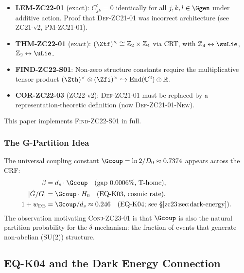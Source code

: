 \documentclass[12pt, a4paper]{article}
\begin{document}
\begin{formalbox}[title={Inherited Results from ZC21/ZC22}]
\begin{itemize}[leftmargin=*, noitemsep]
  \item \textbf{LEM-ZC22-01} (exact): $C_{jk}^l = 0$ identically for all
    $j,k,l\in\Ggen$ under additive action. Proof that \textsc{Def-ZC21-01}
    was incorrect architecture (see ZC21-v2, PM-ZC21-01).
  \item \textbf{THM-ZC22-01} (exact): $(\Ztf)^\times \cong \mathbb{Z}_2\times\mathbb{Z}_4$
    via CRT, with $\mathbb{Z}_4\leftrightarrow\suLie$, $\mathbb{Z}_2\leftrightarrow\uLie$.
  \item \textbf{FIND-ZC22-S01}: Non-zero structure constants require the
    multiplicative tensor product $(\Zth)^\times\otimes(\Zfi)^\times
    \hookrightarrow\mathrm{End}(\mathbb{C}^2)\oplus\mathbb{R}$.
  \item \textbf{COR-ZC22-03} (ZC22-v2): \textsc{Def-ZC21-01} must be replaced
    by a representation-theoretic definition (now \textsc{Def-ZC21-01-New}).
\end{itemize}
\end{formalbox}

This paper implements \textsc{Find-ZC22-S01} in full.

\subsubsection{The G-Partition Idea}

The universal coupling constant $\Gcoup = \ln 2/D_0 \approx 0.7374$ appears
across the CRF:
\begin{align*}
  \beta &= d_s \cdot \Gcoup \quad\text{(gap }0.0006\%\text{, T-home)},\\
  |\dot{G}/G| &= \Gcoup\cdot H_0 \quad\text{(EQ-K03, cosmic rate)},\\
  1 + w_{\rm DE} &= \Gcoup/d_s \approx 0.246 \quad\text{(EQ-K04; see §\ref{zc23:sec:dark-energy})}.
\end{align*}
The observation motivating \textsc{Conj-ZC23-01} is that $\Gcoup$
is also the natural partition probability for the $\delta$-mechanism:
the fraction of events that generate non-abelian (SU(2)) structure.

\subsection{EQ-K04 and the Dark Energy Connection}
\label{zc23:sec:dark-energy}
\end{document}
